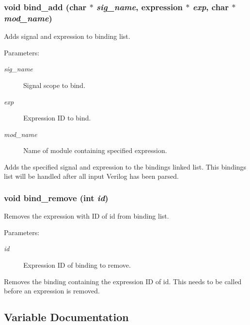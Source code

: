 \subsubsection{\setlength{\rightskip}{0pt plus 5cm}void bind\_\-add (char $\ast$ {\em sig\_\-name}, {\bf expression} $\ast$ {\em exp}, char $\ast$ {\em mod\_\-name})}\label{binding_8c_a4}


Adds signal and expression to binding list.

\begin{Desc}
\item[Parameters: ]\par
\begin{description}
\item[{\em 
sig\_\-name}]Signal scope to bind. \item[{\em 
exp}]Expression ID to bind. \item[{\em 
mod\_\-name}]Name of module containing specified expression.\end{description}
\end{Desc}
Adds the specified signal and expression to the bindings linked list. This bindings list will be handled after all input Verilog has been parsed. 
\subsubsection{\setlength{\rightskip}{0pt plus 5cm}void bind\_\-remove (int {\em id})}\label{binding_8c_a5}


Removes the expression with ID of id from binding list.

\begin{Desc}
\item[Parameters: ]\par
\begin{description}
\item[{\em 
id}]Expression ID of binding to remove.\end{description}
\end{Desc}
Removes the binding containing the expression ID of id. This needs to be called before an expression is removed. 

\subsection{Variable Documentation}
